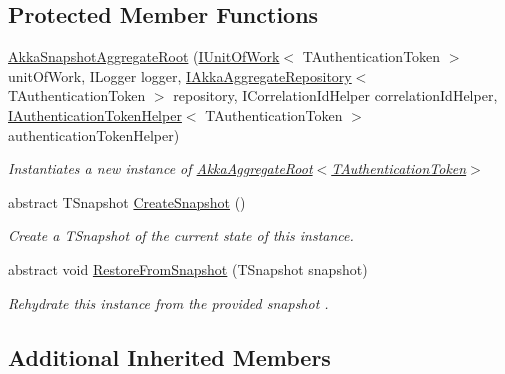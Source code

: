 \subsection*{Protected Member Functions}
\begin{DoxyCompactItemize}
\item 
\hyperlink{classCqrs_1_1Akka_1_1Snapshots_1_1AkkaSnapshotAggregateRoot_ad4b8d2784fa49f72e83ee9f7e4c43d85_ad4b8d2784fa49f72e83ee9f7e4c43d85}{Akka\+Snapshot\+Aggregate\+Root} (\hyperlink{interfaceCqrs_1_1Domain_1_1IUnitOfWork}{I\+Unit\+Of\+Work}$<$ T\+Authentication\+Token $>$ unit\+Of\+Work, I\+Logger logger, \hyperlink{interfaceCqrs_1_1Akka_1_1Domain_1_1IAkkaAggregateRepository}{I\+Akka\+Aggregate\+Repository}$<$ T\+Authentication\+Token $>$ repository, I\+Correlation\+Id\+Helper correlation\+Id\+Helper, \hyperlink{interfaceCqrs_1_1Authentication_1_1IAuthenticationTokenHelper}{I\+Authentication\+Token\+Helper}$<$ T\+Authentication\+Token $>$ authentication\+Token\+Helper)
\begin{DoxyCompactList}\small\item\em Instantiates a new instance of \hyperlink{classCqrs_1_1Akka_1_1Domain_1_1AkkaAggregateRoot_a060f981e4c3023aec36e7c6f1cfb3a9d_a060f981e4c3023aec36e7c6f1cfb3a9d}{Akka\+Aggregate\+Root$<$\+T\+Authentication\+Token$>$} \end{DoxyCompactList}\item 
abstract T\+Snapshot \hyperlink{classCqrs_1_1Akka_1_1Snapshots_1_1AkkaSnapshotAggregateRoot_af8493f71231046d91210406c3b831e20_af8493f71231046d91210406c3b831e20}{Create\+Snapshot} ()
\begin{DoxyCompactList}\small\item\em Create a {\itshape T\+Snapshot}  of the current state of this instance. \end{DoxyCompactList}\item 
abstract void \hyperlink{classCqrs_1_1Akka_1_1Snapshots_1_1AkkaSnapshotAggregateRoot_ad0a742b95699a997e51f03140c50fb74_ad0a742b95699a997e51f03140c50fb74}{Restore\+From\+Snapshot} (T\+Snapshot snapshot)
\begin{DoxyCompactList}\small\item\em Rehydrate this instance from the provided {\itshape snapshot} . \end{DoxyCompactList}\end{DoxyCompactItemize}
\subsection*{Additional Inherited Members}


